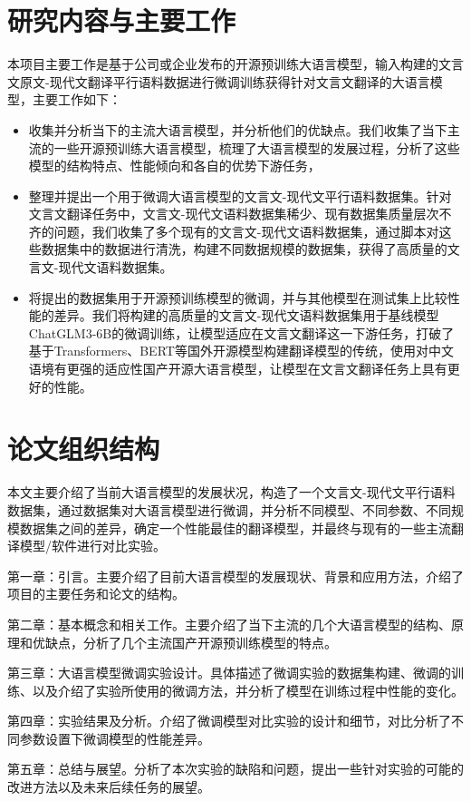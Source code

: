 \documentclass[
    decl-page,  %
    ,fontset = win, %
  ]{njuthesis}
\begin{document}
\section{研究内容与主要工作}
本项目主要工作是基于公司或企业发布的开源预训练大语言模型，输入构建的文言文原文-现代文翻译平行语料数据进行微调训练获得针对文言文翻译的大语言模型，主要工作如下：
\begin{itemize}
    \item 收集并分析当下的主流大语言模型，并分析他们的优缺点。我们收集了当下主流的一些开源预训练大语言模型，梳理了大语言模型的发展过程，分析了这些模型的结构特点、性能倾向和各自的优势下游任务，
    \item 整理并提出一个用于微调大语言模型的文言文-现代文平行语料数据集。针对文言文翻译任务中，文言文-现代文语料数据集稀少、现有数据集质量层次不齐的问题，我们收集了多个现有的文言文-现代文语料数据集，通过脚本对这些数据集中的数据进行清洗，构建不同数据规模的数据集，获得了高质量的文言文-现代文语料数据集。
    \item 将提出的数据集用于开源预训练模型的微调，并与其他模型在测试集上比较性能的差异。我们将构建的高质量的文言文-现代文语料数据集用于基线模型ChatGLM3-6B的微调训练，让模型适应在文言文翻译这一下游任务，打破了基于Transformers、BERT等国外开源模型构建翻译模型的传统，使用对中文语境有更强的适应性国产开源大语言模型，让模型在文言文翻译任务上具有更好的性能。
\end{itemize}

\section{论文组织结构}
本文主要介绍了当前大语言模型的发展状况，构造了一个文言文-现代文平行语料数据集，通过数据集对大语言模型进行微调，并分析不同模型、不同参数、不同规模数据集之间的差异，确定一个性能最佳的翻译模型，并最终与现有的一些主流翻译模型/软件进行对比实验。

第一章：引言。主要介绍了目前大语言模型的发展现状、背景和应用方法，介绍了项目的主要任务和论文的结构。

第二章：基本概念和相关工作。主要介绍了当下主流的几个大语言模型的结构、原理和优缺点，分析了几个主流国产开源预训练模型的特点。

第三章：大语言模型微调实验设计。具体描述了微调实验的数据集构建、微调的训练、以及介绍了实验所使用的微调方法，并分析了模型在训练过程中性能的变化。

第四章：实验结果及分析。介绍了微调模型对比实验的设计和细节，对比分析了不同参数设置下微调模型的性能差异。

第五章：总结与展望。分析了本次实验的缺陷和问题，提出一些针对实验的可能的改进方法以及未来后续任务的展望。
\end{document}
